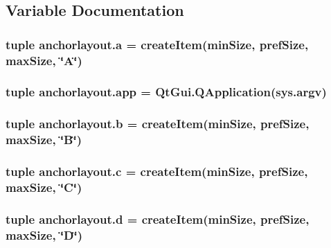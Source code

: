 \subsection{Variable Documentation}
\hypertarget{namespaceanchorlayout_a29c630f8fc1b67da915bbe700004dd07}{}
\subsubsection[{a}]{\setlength{\rightskip}{0pt plus 5cm}tuple anchorlayout.\+a = {\bf create\+Item}({\bf min\+Size}, {\bf pref\+Size}, {\bf max\+Size}, \char`\"{}A\char`\"{})}\label{namespaceanchorlayout_a29c630f8fc1b67da915bbe700004dd07}
\hypertarget{namespaceanchorlayout_ab9ba57f530d08f9fd5db4d94f6b3e200}{}
\subsubsection[{app}]{\setlength{\rightskip}{0pt plus 5cm}tuple anchorlayout.\+app = Qt\+Gui.\+Q\+Application(sys.\+argv)}\label{namespaceanchorlayout_ab9ba57f530d08f9fd5db4d94f6b3e200}
\hypertarget{namespaceanchorlayout_ab4f1761324bb6d566a781389d2414d5f}{}
\subsubsection[{b}]{\setlength{\rightskip}{0pt plus 5cm}tuple anchorlayout.\+b = {\bf create\+Item}({\bf min\+Size}, {\bf pref\+Size}, {\bf max\+Size}, \char`\"{}B\char`\"{})}\label{namespaceanchorlayout_ab4f1761324bb6d566a781389d2414d5f}
\hypertarget{namespaceanchorlayout_aff01d0aa95f3f581b1bae38d57c55710}{}
\subsubsection[{c}]{\setlength{\rightskip}{0pt plus 5cm}tuple anchorlayout.\+c = {\bf create\+Item}({\bf min\+Size}, {\bf pref\+Size}, {\bf max\+Size}, \char`\"{}C\char`\"{})}\label{namespaceanchorlayout_aff01d0aa95f3f581b1bae38d57c55710}
\hypertarget{namespaceanchorlayout_aac7e1e9dc1ef562d70676910e91d1a7d}{}
\subsubsection[{d}]{\setlength{\rightskip}{0pt plus 5cm}tuple anchorlayout.\+d = {\bf create\+Item}({\bf min\+Size}, {\bf pref\+Size}, {\bf max\+Size}, \char`\"{}D\char`\"{})}\label{namespaceanchorlayout_aac7e1e9dc1ef562d70676910e91d1a7d}
\hypertarget{namespaceanchorlayout_afef44353655532b8178bdd762c271458}{}
